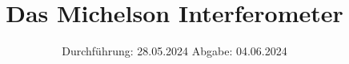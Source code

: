 

\subject{V401}
\title{Das Michelson Interferometer}
\date{%
  Durchführung: 28.05.2024
  \hspace{3em}
  Abgabe: 04.06.2024
}



\maketitle
\thispagestyle{empty}
\tableofcontents
\newpage






\printbibliography{}
\appendix
\setcounter{secnumdepth}{0}

